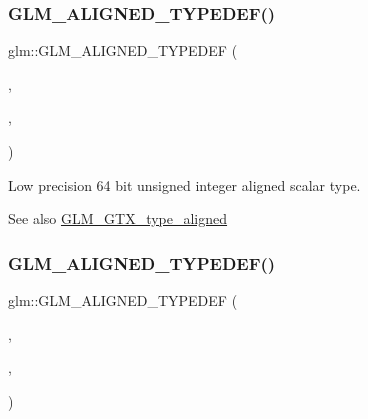 \subsubsection{\texorpdfstring{G\+L\+M\+\_\+\+A\+L\+I\+G\+N\+E\+D\+\_\+\+T\+Y\+P\+E\+D\+E\+F()}{GLM\_ALIGNED\_TYPEDEF()}\hspace{0.1cm}{\footnotesize\ttfamily [76/209]}}
{\footnotesize\ttfamily glm\+::\+G\+L\+M\+\_\+\+A\+L\+I\+G\+N\+E\+D\+\_\+\+T\+Y\+P\+E\+D\+EF (\begin{DoxyParamCaption}\item[{\hyperlink{group__gtc__type__precision_gabf3069d4f188557a87b1d7f35eb0a270}{lowp\+\_\+uint64\+\_\+t}}]{,  }\item[{aligned\+\_\+lowp\+\_\+uint64\+\_\+t}]{,  }\item[{8}]{ }\end{DoxyParamCaption})}

Low precision 64 bit unsigned integer aligned scalar type. \begin{DoxySeeAlso}{See also}
\hyperlink{group__gtx__type__aligned}{G\+L\+M\+\_\+\+G\+T\+X\+\_\+type\+\_\+aligned} 
\end{DoxySeeAlso}
\mbox{\label{group__gtx__type__aligned_gad7bb97c29d664bd86ffb1bed4abc5534}} 
\subsubsection{\texorpdfstring{G\+L\+M\+\_\+\+A\+L\+I\+G\+N\+E\+D\+\_\+\+T\+Y\+P\+E\+D\+E\+F()}{GLM\_ALIGNED\_TYPEDEF()}\hspace{0.1cm}{\footnotesize\ttfamily [77/209]}}
{\footnotesize\ttfamily glm\+::\+G\+L\+M\+\_\+\+A\+L\+I\+G\+N\+E\+D\+\_\+\+T\+Y\+P\+E\+D\+EF (\begin{DoxyParamCaption}\item[{\hyperlink{group__gtc__type__precision_gae63f942c49a30dbf266b2f13f3efe257}{lowp\+\_\+u8}}]{,  }\item[{aligned\+\_\+lowp\+\_\+u8}]{,  }\item[{1}]{ }\end{DoxyParamCaption})}

